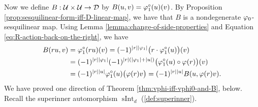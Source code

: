 %




Now we define $B: \mathcal U\times \mathcal U \to \mathcal{D}$ by $B(u, v) = \varphi_1^\circ (u)(v)$.
By Proposition \ref{prop:sesquilinear-form-iff-D-linear-map}, we have that $B$ is a nondegenerate $\varphi_0$-sesquilinear map.
Using Lemma \ref{lemma:change-of-side-properties} and Equation \eqref{eq:R-action-back-on-the-right}, we have
%
\begin{equation*}
	\begin{split}
		B(ru,v) &= \varphi_1^\circ (ru)(v) = (-1)^{|r||\varphi_1|} \big(r \cdot \varphi_1^\circ (u) \big) (v)\\ &= (-1)^{|r||\varphi_1|} (-1)^{|r|(|\varphi_1| + |u|)} \big(\varphi_1^\circ (u) \circ \varphi(r) \big)(v) \\ &= (-1)^{|r||u|} \varphi_1^\circ (u) \big( \varphi(r)v \big)= (-1)^{|r||u|} B(u,\varphi(r)v).
	\end{split}
\end{equation*}
We have proved one direction of Theorem \ref{thm:vphi-iff-vphi0-and-B}, below. 
Recall the superinner automorphism $\operatorname{sInt}_d$ (\cref{def:superinner}). 

